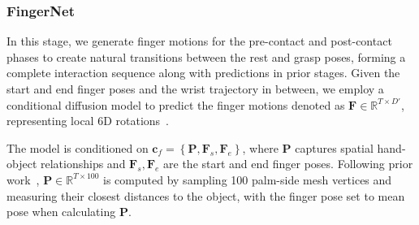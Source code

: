 \subsubsection{FingerNet}
\label{sec:low_level_finger}
In this stage, we generate finger motions for the pre-contact and post-contact phases to create natural transitions between the rest and grasp poses, forming a complete interaction sequence along with predictions in prior stages.
Given the start and end finger poses and the wrist trajectory in between, we employ a conditional diffusion model to predict the finger motions denoted as $\bm{F} \in \mathbb{R}^{T\times D'}$, representing local 6D rotations~\cite{zhou2019continuity}.





 
The model is conditioned on $\bm{c}_{f} = \left\{\bm{P}, \bm{F}_{s}, \bm{F}_{e}\right\}$, where $\bm{P}$ captures spatial hand-object relationships and $\bm{F}_{s}, \bm{F}_{e}$ are the start and end finger poses. Following prior work~\cite{zhang2021manipnet,taheri2023grip}, $\bm{P} \in \mathbb{R}^{T \times 100}$ is computed by sampling 100 palm-side mesh vertices and measuring their closest distances to the object, with the finger pose set to mean pose when calculating $\bm{P}$. 


